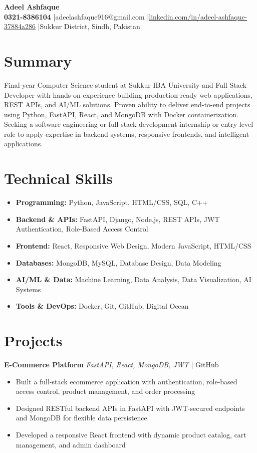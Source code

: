 \documentclass[11pt,a4paper]{article}
\newcommand{\resumeHeader}[5]{
    \begin{center}
        {\Huge\bfseries\color{heading} #1}\\[0.4em]
        {\normalsize\color{body}
        \textbf{#2} \quad|\quad #3 \quad|\quad \href{https://#4}{#4} \quad|\quad #5}
    \end{center}
    \vspace{0.3em}
}
\begin{document}
\resumeHeader
    {Adeel Ashfaque}
    {0321-8386104}
    {adeelashfaque916@gmail.com}
    {linkedin.com/in/adeel-ashfaque-37884a286}
    {Sukkur District, Sindh, Pakistan}

\section{Summary}
Final-year Computer Science student at Sukkur IBA University and Full Stack Developer with hands-on experience building production-ready web applications, REST APIs, and AI/ML solutions. Proven ability to deliver end-to-end projects using Python, FastAPI, React, and MongoDB with Docker containerization. Seeking a software engineering or full stack development internship or entry-level role to apply expertise in backend systems, responsive frontends, and intelligent applications.

\section{Technical Skills}
\begin{itemize}[label={}]
    \item \textbf{Programming:} Python, JavaScript, HTML/CSS, SQL, C++
    \item \textbf{Backend \& APIs:} FastAPI, Django, Node.js, REST APIs, JWT Authentication, Role-Based Access Control
    \item \textbf{Frontend:} React, Responsive Web Design, Modern JavaScript, HTML/CSS
    \item \textbf{Databases:} MongoDB, MySQL, Database Design, Data Modeling
    \item \textbf{AI/ML \& Data:} Machine Learning, Data Analysis, Data Visualization, AI Systems
    \item \textbf{Tools \& DevOps:} Docker, Git, GitHub, Digital Ocean
\end{itemize}

\section{Projects}

\textbf{E-Commerce Platform} \hfill \textit{FastAPI, React, MongoDB, JWT} $|$ GitHub
\begin{itemize}
    \item Built a full-stack ecommerce application with authentication, role-based access control, product management, and order processing
    \item Designed RESTful backend APIs in FastAPI with JWT-secured endpoints and MongoDB for flexible data persistence
    \item Developed a responsive React frontend with dynamic product catalog, cart management, and admin dashboard
\end{itemize}
\end{document}

